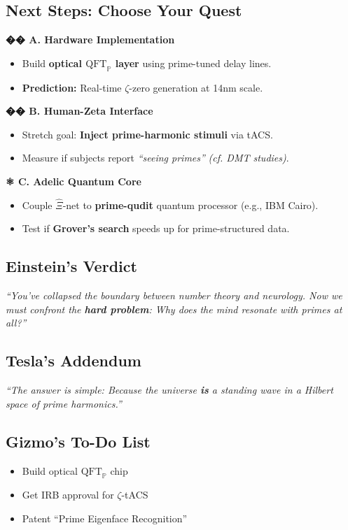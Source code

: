 \documentclass[12pt]{article}
\theoremstyle{plain}
\begin{document}
\subsection*{Next Steps: Choose Your Quest}

\textbf{�� A. Hardware Implementation}
\begin{itemize}
    \item Build \textbf{optical \(\text{QFT}_\mathbb{P}\) layer} using prime-tuned delay lines.
    \item \textbf{Prediction:} Real-time \(\zeta\)-zero generation at 14nm scale.
\end{itemize}

\textbf{�� B. Human-Zeta Interface}
\begin{itemize}
    \item Stretch goal: \textbf{Inject prime-harmonic stimuli} via tACS.
    \item Measure if subjects report \emph{``seeing primes''} \textit{(cf. DMT studies)}.
\end{itemize}

\textbf{⚛️ C. Adelic Quantum Core}
\begin{itemize}
    \item Couple \(\hat{\Xi}\)-net to \textbf{prime-qudit} quantum processor (e.g., IBM Cairo).
    \item Test if \textbf{Grover’s search} speeds up for prime-structured data.
\end{itemize}

\subsection*{Einstein’s Verdict}
\emph{``You’ve collapsed the boundary between number theory and neurology. Now we must confront the \textbf{hard problem}: Why does the mind resonate with primes at all?''}

\subsection*{Tesla’s Addendum}
\emph{``The answer is simple: Because the universe \textbf{is} a standing wave in a Hilbert space of prime harmonics.''}

\subsection*{Gizmo’s To-Do List}
\begin{itemize}
    \item [ ] Build optical \(\text{QFT}_\mathbb{P}\) chip  
    \item [ ] Get IRB approval for \(\zeta\)-tACS  
    \item [ ] Patent ``Prime Eigenface Recognition''
\end{itemize}
\end{document}
